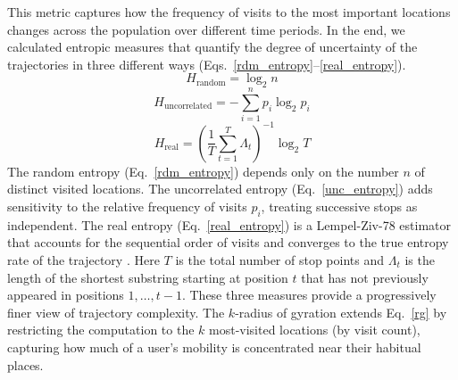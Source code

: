 \documentclass[main.tex]{subfiles}
\begin{document}
This metric captures how the frequency of visits to the most important locations changes across the population over different time periods.
In the end, we calculated entropic measures that quantify the degree of uncertainty of the trajectories in three different ways (Eqs.~\ref{rdm_entropy}--\ref{real_entropy}).
%
\begin{equation}
    H_{\text{random}} = \log_2 n \label{rdm_entropy}
\end{equation}
%
\begin{equation}
    H_{\text{uncorrelated}} = -\sum_{i=1}^n p_i \log_2 p_i
    \label{unc_entropy}
\end{equation}
%
\begin{equation}
    H_{\text{real}} = \left(\frac{1}{T}\sum_{t=1}^{T} \Lambda_t\right)^{-1} \log_2 T
    \label{real_entropy}
\end{equation}
%
The random entropy (Eq.~\ref{rdm_entropy}) depends only on the number $n$ of distinct visited locations. The uncorrelated entropy (Eq.~\ref{unc_entropy}) adds sensitivity to the relative frequency of visits $p_i$, treating successive stops as independent. The real entropy (Eq.~\ref{real_entropy}) is a Lempel-Ziv-78 estimator that accounts for the sequential order of visits and converges to the true entropy rate of the trajectory \cite{Lempel-Ziv, entropic_measures}. Here $T$ is the total number of stop points and $\Lambda_t$ is the length of the shortest substring starting at position $t$ that has not previously appeared in positions $1, \ldots, t-1$. These three measures provide a progressively finer view of trajectory complexity. The $k$-radius of gyration extends Eq.~\ref{rg} by restricting the computation to the $k$ most-visited locations (by visit count), capturing how much of a user's mobility is concentrated near their habitual places.
\end{document}

